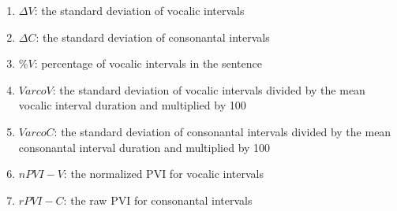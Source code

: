 \begin{enumerate}
\item $\Delta V$: the standard deviation of vocalic intervals
\item $\Delta C$: the standard deviation of consonantal intervals
\item $\%V$: percentage of vocalic intervals in the sentence
\item $VarcoV$: the standard deviation of vocalic intervals divided by the mean vocalic interval duration and multiplied by 100
\item $VarcoC$: the standard deviation of consonantal intervals divided by the mean consonantal interval duration and multiplied by 100
\item $nPVI-V$: the normalized PVI for vocalic intervals
\item $rPVI-C$: the raw PVI for consonantal intervals
\end{enumerate}

